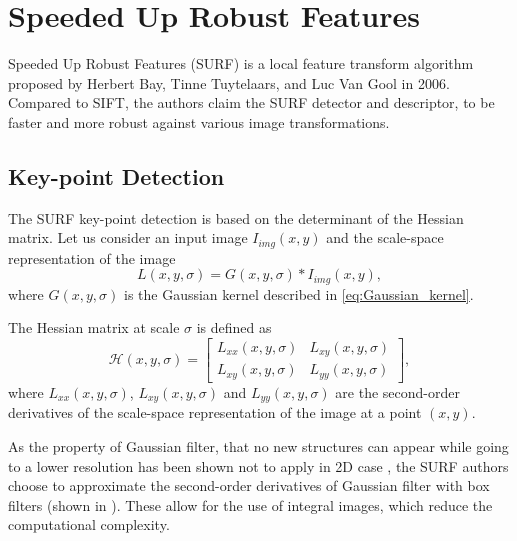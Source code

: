 \section{Speeded Up Robust Features}
Speeded Up Robust Features (SURF) is a local feature transform algorithm proposed by Herbert Bay, Tinne Tuytelaars, and Luc Van Gool in 2006\cite{Bay2006}. Compared to SIFT\cite{Lowe1999}, the authors claim the SURF detector and descriptor, to be faster and more robust against various image transformations.

\subsection{Key-point Detection}
The SURF key-point detection is based on the determinant of the Hessian matrix. Let us consider an input image $I_{img}(x,y)$ and the scale-space representation of the image
\begin{equation}
    L(x, y,\sigma) =  G(x,y,\sigma)*I_{img}(x,y),
\end{equation}
where $G(x,y,\sigma)$ is the Gaussian kernel described in \eqref{eq:Gaussian_kernel}.

The Hessian matrix at scale $\sigma$ is defined as
\begin{equation}
    \mathcal{H}(x, y, \sigma) =
    \begin{bmatrix}
        L_{xx}(x, y, \sigma) & L_{xy}(x, y, \sigma)\\
        L_{xy}(x, y, \sigma) & L_{yy}(x, y, \sigma)
    \end{bmatrix},
\end{equation}
where $L_{xx}(x, y, \sigma)$, $L_{xy}(x, y, \sigma)$ and $L_{yy}(x, y, \sigma)$ are the second-order derivatives of the scale-space representation of the image at a point $(x, y)$.

As the property of Gaussian filter, that no new structures can appear while going to a lower resolution has been shown not to apply in 2D case \cite{Koenderink1984}, the SURF authors choose to approximate the second-order derivatives of Gaussian filter with box filters (shown in ). These allow for the use of integral images, which reduce the computational complexity.

